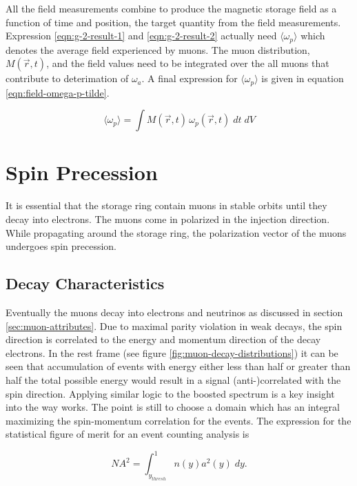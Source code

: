 All the field measurements combine to produce the magnetic storage field as a function of time and position, the target quantity from the field measurements.  Expression \ref{eqn:g-2-result-1} and \ref{eqn:g-2-result-2} actually need $\langle \omega_p \rangle$ which denotes the average field experienced by muons.  The muon distribution, $M(\vec{r}, t)$, and the field values need to be integrated over the all muons that contribute to deterimation of $\omega_a$.  A final expression for $\langle \omega_p \rangle$ is given in equation \ref{eqn:field-omega-p-tilde}.

\begin{equation}
\label{eqn:field-omega-p-tilde}
\langle \omega_p \rangle = \int M(\vec{r}, t) \, \omega_p(\vec{r}, t)\; dt\;dV
\end{equation}

\section{Spin Precession} \label{sec:spin-precession}

It is essential that the storage ring contain muons in stable orbits until they decay into electrons.  The muons come in polarized in the injection direction.  While propagating around the storage ring, the polarization vector of the muons undergoes spin precession.

\subsection{Decay Characteristics}

Eventually the muons decay into electrons and neutrinos as discussed in section \ref{sec:muon-attributes}. Due to maximal parity violation in weak decays, the spin direction is correlated to the energy and momentum direction of the decay electrons.  In the rest frame (see figure \ref{fig:muon-decay-distributions}) it can be seen that accumulation of events with energy either less than half or greater than half the total possible energy would result in a signal (anti-)correlated with the spin direction.  Applying similar logic to the boosted spectrum is a key insight into the way \gmtwo works.  The point is still to choose a domain which has an integral maximizing the spin-momentum correlation for the events.  The expression for the statistical figure of merit for an event counting analysis is

\begin{equation}
\label{eqn:expt-figure-of-merit}
NA^2 = \int_{y_{thresh}}^{1} n(y) a^2(y) \;dy.
\end{equation}

